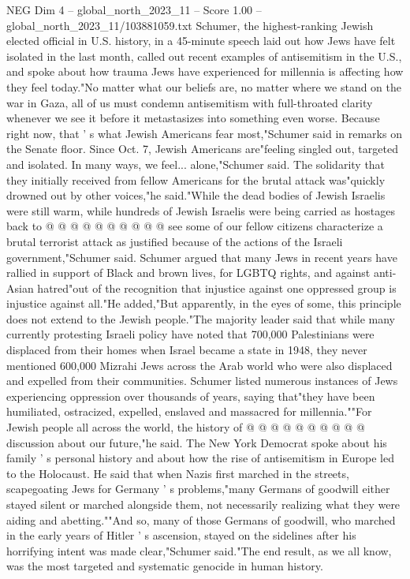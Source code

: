 \begin{textsample}{NEG Dim 4 – global\_north\_2023\_11 – Score 1.00 – global\_north\_2023\_11/103881059.txt}  \label{ex:f4_neg_255}
Schumer, the highest-ranking Jewish elected official in U.S. history, in a 45-minute speech laid out how Jews have felt isolated in the last month, called out recent examples of antisemitism in the U.S., and spoke about how trauma Jews have experienced for millennia is affecting how they feel today."No matter what our beliefs are, no matter where we stand on the war in Gaza, all of us must condemn antisemitism with full-throated clarity whenever we see it before it metastasizes into something even worse.
Because right now, that ' s what Jewish Americans fear most,"Schumer said in remarks on the Senate floor.
Since Oct. 7, Jewish Americans are"feeling singled out, targeted and isolated.
In many ways, we feel... alone,"Schumer said.
The solidarity that they initially received from fellow Americans for the brutal attack was"quickly drowned out by other voices,"he said."While the dead bodies of Jewish Israelis were still warm, while hundreds of Jewish Israelis were being carried as hostages back to @ @ @ @ @ @ @ @ @ @ see some of our fellow citizens characterize a brutal terrorist attack as justified because of the actions of the Israeli government,"Schumer said.
Schumer argued that many Jews in recent years have rallied in support of Black and brown lives, for LGBTQ rights, and against anti-Asian hatred"out of the recognition that injustice against one oppressed group is injustice against all."He added,"But apparently, in the eyes of some, this principle does not extend to the Jewish people."The majority leader said that while many currently protesting Israeli policy have noted that 700,000 Palestinians were displaced from their homes when Israel became a state in 1948, they never mentioned 600,000 Mizrahi Jews across the Arab world who were also displaced and expelled from their communities.
Schumer listed numerous instances of Jews experiencing oppression over thousands of years, saying that"they have been humiliated, ostracized, expelled, enslaved and massacred for millennia.""For Jewish people all across the world, the history of @ @ @ @ @ @ @ @ @ @ discussion about our future,"he said.
The New York Democrat spoke about his family ' s personal history and about how the rise of antisemitism in Europe led to the Holocaust.
He said that when Nazis first marched in the streets, scapegoating Jews for Germany ' s problems,"many Germans of goodwill either stayed silent or marched alongside them, not necessarily realizing what they were aiding and abetting.""And so, many of those Germans of goodwill, who marched in the early years of Hitler ' s ascension, stayed on the sidelines after his horrifying intent was made clear,"Schumer said."The end result, as we all know, was the most targeted and systematic genocide in human history.

\end{textsample}

